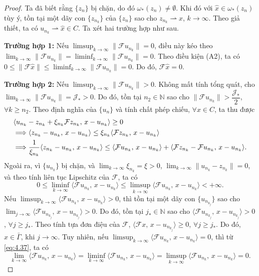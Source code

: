 \documentclass[11pt,a4paper]{article}
\theoremstyle{plain}
\theoremstyle{definition}
\theoremstyle{remark}
\numberwithin{equation}{section}
\newcommand{\Fc}{\mathcal{F}}
\newcommand{\inp}[2]{\langle #1,\,#2\rangle}
\newcommand{\nm}[1]{\lVert #1\rVert}
\newcommand{\wto}{\rightharpoonup}
\newcommand{\N}{\mathbb{N}}
\newcommand{\Gam}{\bar{\Gamma}}
\begin{document}
\begin{proof}
Ta đã biết rằng $\{z_n\}$ bị chặn, do đó $\omega_{*}(z_n)\ne\emptyset$. Khi đó với $\hat{x}\in\omega_{*}(z_n)$ tùy ý, tồn tại một dãy con $\{z_{n_k}\}$ của $\{z_n\}$ sao cho $z_{n_k}\wto\hat{x}$, $k\to\infty$. Theo giả thiết, ta có $u_{n_k}\wto\hat{x}\in C$. Ta xét hai trường hợp như sau.

\medskip
\noindent\textbf{Trường hợp 1:} Nếu $\limsup_{k\to\infty}\nm{\Fc u_{n_k}}=0$, điều này kéo theo $\lim_{k\to\infty}\nm{\Fc u_{n_k}}=\liminf_{k\to\infty}\nm{\Fc u_{n_k}}=0$. Theo điều kiện (A2), ta có $0\le\nm{\Fc\hat{x}}\le\liminf_{k\to\infty}\nm{\Fc u_{n_k}}=0$. Do đó, $\Fc\hat{x}=0$.

\medskip
\noindent\textbf{Trường hợp 2:} Nếu $\limsup_{k\to\infty}\nm{\Fc u_{n_k}}>0$. Không mất tính tổng quát, cho $\lim_{k\to\infty}\nm{\Fc u_{n_k}}=\mathcal{J}_{*}>0$. Do đó, tồn tại $n_2\in\N$ sao cho $\nm{\Fc u_{n_k}}>\dfrac{\mathcal{J}_{*}}{2}$, $\forall k\ge n_2$. Theo định nghĩa của $\{u_n\}$ và tính chất phép chiếu, $\forall x\in C$, ta thu được
\begin{align}
&\inp{u_{n_k}-z_{n_k}+\xi_{n_k}\Fc z_{n_k}}{x-u_{n_k}}\ge 0\notag\\
&\Longrightarrow \inp{z_{n_k}-u_{n_k}}{x-u_{n_k}}\le\xi_{n_k}\inp{\Fc z_{n_k}}{x-u_{n_k}}\notag\\
&\Longrightarrow \frac{1}{\xi_{n_k}}\inp{z_{n_k}-u_{n_k}}{x-u_{n_k}}\le\inp{\Fc u_{n_k}}{x-u_{n_k}}+\inp{\Fc z_{n_k}-\Fc u_{n_k}}{x-u_{n_k}}. \label{eq:4.36}
\end{align}
Ngoài ra, vì $\{u_{n_k}\}$ bị chặn, và $\lim_{k\to\infty}\xi_{n_k}=\xi>0$, $\lim_{k\to\infty}\nm{u_{n_k}-z_{n_k}}=0$, và theo tính liên tục Lipschitz của $\Fc$, ta có
\begin{equation}
0\le\liminf_{k\to\infty}\inp{\Fc u_{n_k}}{x-u_{n_k}}\le\limsup_{k\to\infty}\inp{\Fc u_{n_k}}{x-u_{n_k}}<+\infty. \label{eq:4.37}
\end{equation}
Nếu $\limsup_{k\to\infty}\inp{\Fc u_{n_k}}{x-u_{n_k}}>0$, thì tồn tại một dãy con $\{u_{n_{k_j}}\}$ sao cho $\lim_{j\to\infty}\inp{\Fc u_{n_{k_j}}}{x-u_{n_{k_j}}}>0$. Do đó, tồn tại $j_{*}\in\N$ sao cho $\inp{\Fc u_{n_{k_j}}}{x-u_{n_{k_j}}}>0$, $\forall j\ge j_{*}$. Theo tính tựa đơn điệu của $\Fc$, $\inp{\Fc x}{x-u_{n_{k_j}}}\ge 0$, $\forall j\ge j_{*}$. Do đó, $\hat{x}\in\Gam$, khi $j\to\infty$. Tuy nhiên, nếu $\limsup_{k\to\infty}\inp{\Fc u_{n_k}}{x-u_{n_k}}=0$, thì từ \eqref{eq:4.37}, ta có
\[
\lim_{k\to\infty}\inp{\Fc u_{n_k}}{x-u_{n_k}}=\liminf_{k\to\infty}\inp{\Fc u_{n_k}}{x-u_{n_k}}=\limsup_{k\to\infty}\inp{\Fc u_{n_k}}{x-u_{n_k}}=0.
\]
\end{proof}
\end{document}
